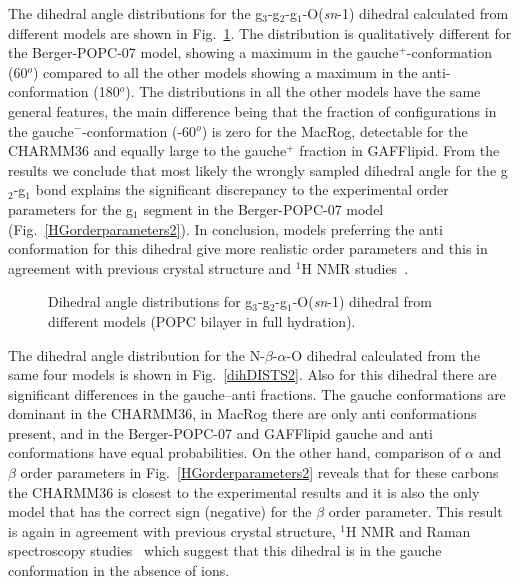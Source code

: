 \documentclass[pre,aps,floatfix,authordate1-4,twocolumn]{revtex4-1}
\begin{document}
The dihedral angle distributions for the  g$_3$-g$_2$-g$_1$-O(\textit{sn}-1) dihedral calculated from different models are
shown in Fig.~\ref{dihDISTS}. The distribution is qualitatively different for the Berger-POPC-07 model, showing a maximum in 
the gauche$^+$-conformation (60$^o$) compared to all the other models showing a maximum in the anti-conformation (180$^o$).
The distributions in all the other models have the same general features, the main difference being that the
fraction of configurations in the gauche$^-$-conformation (-60$^o$) is zero for the MacRog, detectable for the CHARMM36 and
equally large to the gauche$^+$ fraction in GAFFlipid. From the results we conclude that most likely the wrongly sampled
dihedral angle for the g$_2$-g$_1$ bond explains the significant discrepancy to the experimental order parameters
for the g$_1$ segment in the Berger-POPC-07 model (Fig.~\ref{HGorderparameters2}). 
In conclusion, models preferring the anti conformation for this dihedral give more realistic order parameters and
this in agreement with previous crystal structure and $^1$H NMR studies~\cite{hauser80,hauser81,hauser81b,hauser88,pascher92,marsh06}.
\begin{figure}[]
  \centering
  \caption{\label{dihDISTS}
    Dihedral angle distributions for g$_3$-g$_2$-g$_1$-O(\textit{sn}-1) dihedral from different models (POPC bilayer in full hydration).
      } 
\end{figure}

The dihedral angle distribution for the  N-$\beta$-$\alpha$-O dihedral calculated from the same four models is 
shown in Fig.~\ref{dihDISTS2}. Also for this dihedral there are significant differences in the gauche--anti fractions.
The gauche conformations are dominant in the CHARMM36, in MacRog there are only anti conformations present,
and in the Berger-POPC-07 and GAFFlipid gauche and anti conformations have equal probabilities. 
On the other hand, comparison of $\alpha$ and $\beta$ order parameters in Fig.~\ref{HGorderparameters2}
reveals that for these carbons the CHARMM36 is closest to the experimental results and it is also the only model that has the correct
sign (negative) for the $\beta$ order parameter. This result is again in agreement with previous 
crystal structure, $^1$H NMR and Raman spectroscopy studies~\cite{hauser80,hauser81,hauser81b,akutsu81b} which suggest that
this dihedral is in the gauche conformation in the absence of ions.
\end{document}
